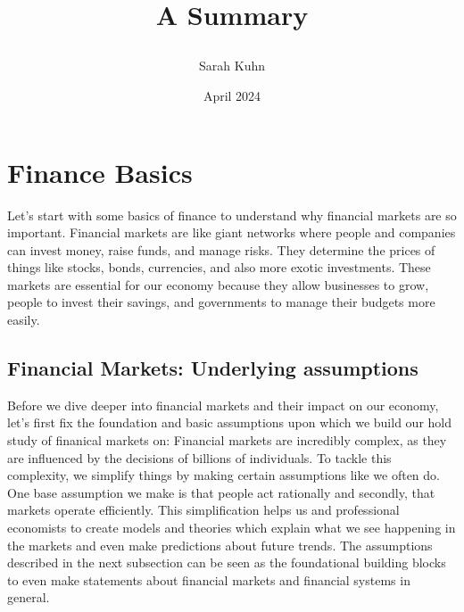 \documentclass{article}
\title{%
  \large {A Summary}
\author{Sarah Kuhn}
\date{April 2024}
}
\begin{document}
\maketitle
\thispagestyle{empty} %

\newpage
{} %
\setcounter{page}{1} %

\section{Finance Basics}
Let's start with some basics of finance to understand why financial markets are so important. Financial markets are like giant networks where people and companies can invest money, raise funds, and manage risks. They  determine the prices of things like stocks, bonds, currencies, and also more exotic investments. These markets are essential for our economy because they allow  businesses to grow, people to invest their savings, and governments to manage their budgets more easily.

\subsection{Financial Markets: Underlying assumptions} 

Before we dive deeper into financial markets and their impact on our economy, let's first fix the foundation and basic assumptions upon which we build our hold study of finanical markets on:  Financial markets are incredibly complex, as they are influenced by the decisions of billions of individuals. To tackle this complexity, we simplify things by making certain assumptions like we often do. One base assumption we make is that people act rationally and secondly, that markets operate efficiently. This simplification helps us and professional economists to create models and theories which explain what we see happening in the markets and even make predictions about future trends. The assumptions described in the next subsection can be seen as the foundational building blocks to even make statements about financial markets and financial systems in general.
\end{document}
